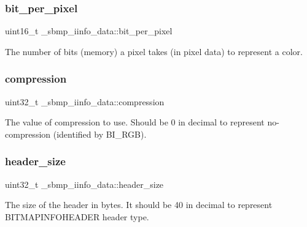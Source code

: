 \subsubsection{\texorpdfstring{bit\+\_\+per\+\_\+pixel}{bit\_per\_pixel}}
{\footnotesize\ttfamily uint16\+\_\+t \+\_\+sbmp\+\_\+iinfo\+\_\+data\+::bit\+\_\+per\+\_\+pixel}



The number of bits (memory) a pixel takes (in pixel data) to represent a color. 

\mbox{\label{struct__sbmp__iinfo__data_adcf2f65ac17f1e8bc6f7b3ed404e3883}} 
\subsubsection{\texorpdfstring{compression}{compression}}
{\footnotesize\ttfamily uint32\+\_\+t \+\_\+sbmp\+\_\+iinfo\+\_\+data\+::compression}



The value of compression to use. Should be \textquotesingle{}0\textquotesingle{} in decimal to represent no-\/compression (identified by \textquotesingle{}B\+I\+\_\+\+R\+GB\textquotesingle{}). 

\mbox{\label{struct__sbmp__iinfo__data_afc4715e7497adc746ddbd34784684b29}} 
\subsubsection{\texorpdfstring{header\+\_\+size}{header\_size}}
{\footnotesize\ttfamily uint32\+\_\+t \+\_\+sbmp\+\_\+iinfo\+\_\+data\+::header\+\_\+size}

The size of the header in bytes. It should be \textquotesingle{}40\textquotesingle{} in decimal to represent B\+I\+T\+M\+A\+P\+I\+N\+F\+O\+H\+E\+A\+D\+ER header type. \mbox{\label{struct__sbmp__iinfo__data_a51fde7d7a00eb71a2f99d80387ca3f7d}} 
